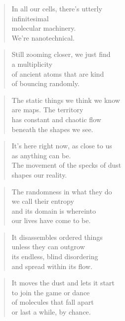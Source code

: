 \documentclass[10pt,a4paper]{article}
\begin{document}
\begin{multicols}{2}
\begin{verse}
In all our cells, there’s utterly\\
infinitesimal\\
molecular machinery.\\
We’re nanotechnical.
\end{verse}

\begin{verse}
Still zooming closer, we just find\\
a multiplicity\\
of ancient atoms that are kind\\
of bouncing randomly.
\end{verse}

\begin{verse}
The static things we think we know\\
are maps. The territory\\
has constant and chaotic flow\\
beneath the shapes we see.
\end{verse}

\begin{verse}
It’s here right now, as close to us\\
as anything can be.\\
The movement of the specks of dust\\
shapes our reality.
\end{verse}

\begin{verse}
The randomness in what they do\\
we call their entropy\\
and its domain is whereinto\\
our lives have come to be.
\end{verse}

\begin{verse}
It disassembles ordered things\\
unless they can outgrow\\
its endless, blind disordering\\
and spread within its flow.
\end{verse}

\begin{verse}
It moves the dust and lets it start\\
to join the game or dance\\
of molecules that fall apart\\
or last a while, by chance.
\end{verse}


\end{multicols}
\end{document}

